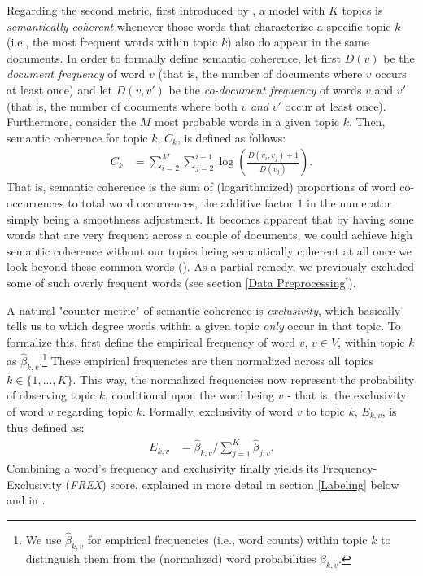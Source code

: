Regarding the second metric, first introduced by \cite{mimno2011optimizing}, a model with $K$ topics is \textit{semantically coherent} whenever those words that characterize a specific topic $k$ (i.e., the most frequent words within topic $k$) also do appear in the same documents. In order to formally define semantic coherence, let first $D(v)$ be the \textit{document frequency} of word $v$ (that is, the number of documents where $v$ occurs at least once) and let $D(v, v')$ be the \textit{co-document frequency} of words $v$ and $v'$ (that is, the number of documents where both $v$ \textit{and} $v'$ occur at least once). Furthermore, consider the $M$ most probable words in a given topic $k$. Then, semantic coherence for topic $k$, $C_{k}$, is defined as follows:
\begin{align*}
C_{k} &= \sum_{i=2}^{M}\sum_{j=2}^{i-1}\log(\frac{D(v_{i}, v_{j})+1}{D(v_{j})}).
\end{align*}
That is, semantic coherence is the sum of (logarithmized) proportions of word co-occurrences to total word occurrences, the additive factor $1$ in the numerator simply being a smoothness adjustment. It becomes apparent that by having some words that are very frequent across a couple of documents, we could achieve high semantic coherence without our topics being semantically coherent at all once we look beyond these common words (\citealp{stm, mimno2011optimizing}). As a partial remedy, we previously excluded some of such overly frequent words (see section \ref{Data Preprocessing}).

A natural "counter-metric" of semantic coherence is \textit{exclusivity}, which basically tells us to which degree words within a given topic \textit{only} occur in that topic. To formalize this, first define the empirical frequency of word $v$, $v\in{V}$, within topic $k$ as $\hat{\beta}_{k,v}$.\footnote{We use $\hat{\beta}_{k,v}$ for empirical frequencies (i.e., word counts) within topic $k$ to distinguish them from the (normalized) word probabilities $\beta_{k,v}$.} These empirical frequencies are then normalized across all topics $k\in\{1,...,K\}$. This way, the normalized frequencies now represent the probability of observing topic $k$, conditional upon the word being $v$ - that is, the exclusivity of word $v$ regarding topic $k$. Formally, exclusivity of word $v$ to topic $k$, $E_{k,v}$, is thus defined as:
\begin{align*}
E_{k,v} &= \hat{\beta}_{k,v}/\sum_{j=1}^{K}\hat{\beta}_{j,v}.
\end{align*}
Combining a word's frequency and exclusivity finally yields its Frequency-Exclusivity (\textit{FREX}) score, explained in more detail in section \ref{Labeling} below and in \cite{bischof2012summarizing}.

